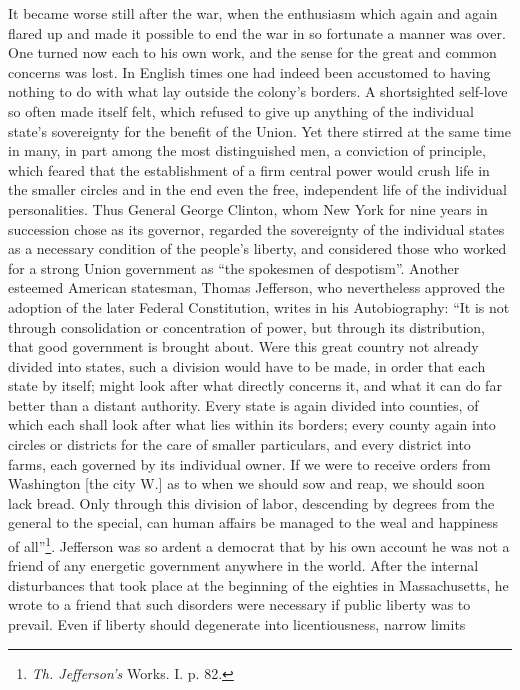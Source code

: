 \documentclass[12pt,a4paper,openany]{book}
\newcommand{\opage}[1]{\marginnote{\footnotesize\textit{[#1]}}}
\begin{document}
It became worse still after the war, when the enthusiasm
\opage{122}which again and again flared up and made it possible to end
the war in so fortunate a manner was over. One turned
now each to his own work, and the sense for the great and common
concerns was lost. In English times one had indeed been
accustomed to having nothing to do with what lay outside
the colony's borders. A shortsighted self-love so often made itself
felt, which refused to give up anything
of the individual state's sovereignty for the benefit of the Union. Yet
there stirred at the same time in many, in part among the most
distinguished men, a conviction of principle, which feared
that the establishment of a firm central power would crush life
in the smaller circles and in the end even the free,
independent life of the individual personalities. Thus
General George Clinton, whom New York for nine years in succession
chose as its governor, regarded the sovereignty of the individual states as
a necessary condition of the people's liberty, and considered those who
worked for a strong Union government as ``the
spokesmen of despotism''. Another esteemed American statesman, Thomas
Jefferson, who nevertheless approved the adoption of the later
Federal Constitution, writes in his Autobiography: ``It is not through
consolidation or concentration of power, but through its
distribution, that good government is brought about. Were this great country
not already divided into states, such a division would have to be made,
in order that each state by itself; might look after what directly
concerns it, and what it can do far better than a distant
authority. Every state is again divided into counties, of which
each shall look after what lies within its borders;
every county again into circles or districts for
the care of smaller particulars, and every district into farms,
each governed by its individual owner. If we were to
receive orders from Washington [the city W.] as to when we should
sow and reap, we should soon lack bread. Only through this
division of labor, descending by degrees from the general to the special,
can human affairs be
managed to the weal and happiness of all''\footnote{\emph{Th. Jefferson's} Works. I. p. 82.}. Jefferson was so ardent a
democrat that by his own account he was not a friend of any
\opage{123}energetic government anywhere in the world. After the internal
disturbances that took place at the beginning of the eighties in
Massachusetts, he wrote to a friend that such disorders were
necessary if public liberty was to prevail. Even
if liberty should degenerate into licentiousness, narrow limits
\end{document}
